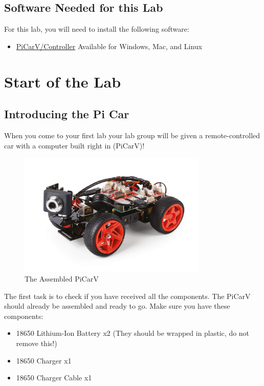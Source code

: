 \documentclass[11pt]{report}
\begin{document}
    \section{Software Needed for this Lab}
    For this lab, you will need to install the following software:
    \begin{itemize}
        \item 
        \href{https://github.com/PiCarV/Controller/releases/latest}{PiCarV/Controller} Available for Windows, Mac, and Linux     
    \end{itemize}


    \clearpage

    \chapter{Start of the Lab}

    \section{Introducing the Pi Car}
    When you come to your first lab your lab group will be given a remote-controlled car with a computer built right in (PiCarV)! 

    \begin{figure}[h]
        \centering
        \includegraphics[width=0.8\textwidth]{picarv.jpg}
        \caption{The Assembled PiCarV}
        \label{fig:The Assembled PiCarV}
    \end{figure}

    The first task is to check if you have received all the components. The PiCarV should already be assembled and ready to go. Make sure you have these components:

    \begin{itemize}
        \item 18650 Lithium-Ion Battery x2 (They should be wrapped in plastic, do not remove this!)
        \item 18650 Charger x1
        \item 18650 Charger Cable x1
    \end{itemize}
\end{document}
